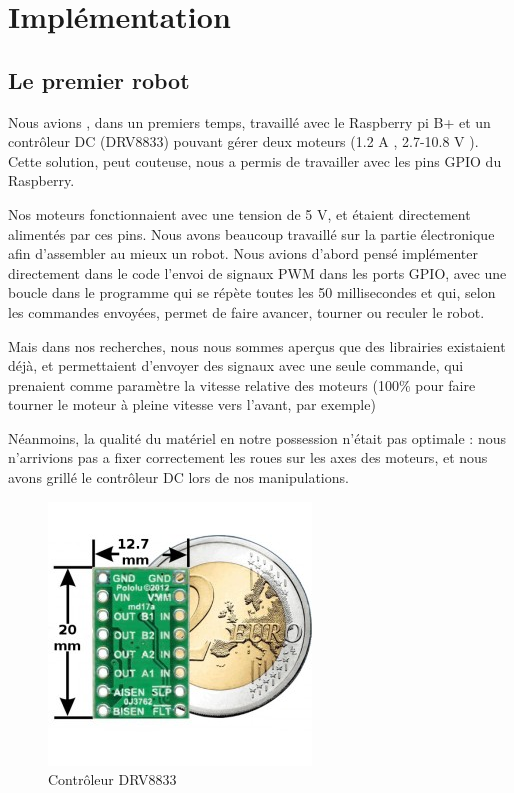 \documentclass[12pt,a4paper]{report}
\begin{document}
\chapter{Implémentation}

\section{Le premier robot}

Nous avions , dans un premiers temps, travaillé avec le Raspberry pi B+ et un contrôleur DC (DRV8833) pouvant gérer deux moteurs (1.2 A , 2.7-10.8 V ). Cette solution, peut couteuse, nous a permis de travailler avec les pins GPIO du Raspberry.

Nos moteurs fonctionnaient avec une tension de 5 V, et étaient directement alimentés par ces pins. Nous avons beaucoup travaillé sur la partie électronique afin d'assembler au mieux un robot. Nous avions d'abord pensé implémenter directement dans le code l'envoi de signaux PWM dans les ports GPIO, avec une boucle dans le programme qui se répète toutes les 50 millisecondes et qui, selon les commandes envoyées, permet de faire avancer, tourner ou reculer le robot.

Mais dans nos recherches, nous nous sommes aperçus que des librairies existaient déjà, et permettaient d'envoyer des signaux avec une seule commande, qui prenaient comme paramètre la vitesse relative des moteurs (100\% pour faire tourner le moteur à pleine vitesse vers l'avant, par exemple) 

Néanmoins, la qualité du matériel en notre possession n'était pas optimale : nous n'arrivions pas a fixer correctement les roues sur les axes des moteurs, et nous avons grillé le contrôleur DC lors de nos manipulations.

\begin{figure}[hf!]
\center
\includegraphics[scale=0.5]{images/y.jpg}
\caption{Contrôleur DRV8833}
\label{GitHub}
\end{figure}
\end{document}
